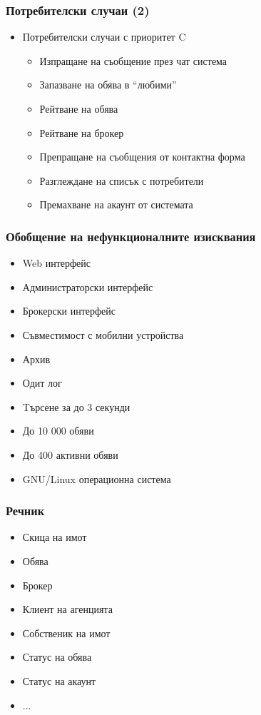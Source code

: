 \documentclass[12pt]{beamer}
\begin{document}
\begin{frame}[fragile]
\frametitle{Потребителски случаи (2)}
\begin{itemize}

	\item{Потребителски случаи с приоритет C
		\begin{itemize}
			\item Изпращане на съобщение през чат система
			\item Запазване на обява в ``любими''
			\item Рейтване на обява
			\item Рейтване на брокер
			\item Препращане на съобщения от контактна форма
			\item Разглеждане на списък с потребители
			\item Премахване на акаунт от системата
		\end{itemize}
	}
\end{itemize}
\end{frame}

\begin{frame}[fragile]
\frametitle{Обобщение на нефункционалните изисквания}
\begin{itemize}
	\item Web интерфейс
	\item Администраторски интерфейс
	\item Брокерски интерфейс
	\item Съвместимост с мобилни устройства
	\item Архив
	\item Одит лог
	\item Tърсене за до 3 секунди
	\item До 10 000 обяви
	\item До 400 активни обяви
	\item GNU/Linux операционна система
\end{itemize}
\end{frame}


\begin{frame}[fragile]
\frametitle{Речник}
\begin{itemize}
	\item Скица на имот
	\item Обява
	\item Брокер
	\item Клиент на агенцията
	\item Собственик на имот
	\item Статус на обява
	\item Статус на акаунт
	\item ...
\end{itemize}
\end{frame}
\end{document}

